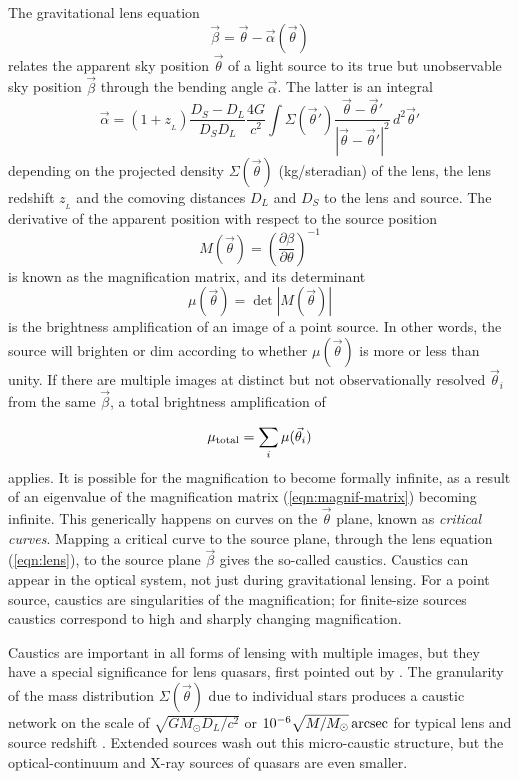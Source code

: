 \documentclass[usenatbib]{mn2e}
\begin{document}
The gravitational lens equation
\begin{equation}
\vec\beta = \vec\theta - \vec\alpha(\vec\theta)
\label{eqn:lens}
\end{equation}
relates the apparent sky position $\vec\theta$ of a light source to
its true but unobservable sky position $\vec\beta$ through the bending
angle $\vec\alpha$.  The latter is an integral 
\begin{equation}
\vec\alpha = (1+z_{_L})\frac{D_S-D_L}{D_SD_L} \frac{4G}{c^2}
\int \Sigma(\vec\theta')
\frac{\vec\theta-\vec\theta'}{|\vec\theta-\vec\theta'|^2}\,
d^2\vec\theta'
\label{eqn:alpha}
\end{equation}
depending on the projected density $\Sigma(\vec\theta)$ (kg/steradian)
of the lens, the lens redshift $z_{_L}$ and the comoving distances
$D_L$ and $D_S$ to the lens and source.  The derivative of the
apparent position with respect to the source position
\begin{equation}
M(\vec\theta) =
\left(\frac{\partial\beta}{\partial\theta}\right)^{-1}
\label{eqn:magnif-matrix}
\end{equation}
is known as the magnification matrix, and its determinant
\begin{equation}
\mu(\vec\theta) = \det|M(\vec\theta)|
\end{equation}
is the brightness amplification of an image of a point source.  In
other words, the source will brighten or dim according to whether
$\mu(\vec\theta)$ is more or less than unity.  If there are multiple
images at distinct but not observationally resolved $\vec\theta_i$ from
the same $\vec\beta$, a total brightness amplification
of

\begin{equation} \mu_{\rm total} = \sum_{i} \mu(\vec\theta_i)
\end{equation}
applies. It is possible for the magnification to become formally
infinite, as a result of an eigenvalue of the magnification matrix
(\ref{eqn:magnif-matrix}) becoming infinite.  This generically happens
on curves on the $\vec\theta$ plane, known as {\em critical curves}.
Mapping a critical curve to the source plane, through the lens
equation (\ref{eqn:lens}), to the source plane $\vec\beta$ gives the
so-called caustics.  Caustics can appear in the optical system, not just
during gravitational lensing.  For a point source, caustics are singularities
of the magnification; for finite-size sources caustics correspond to
high and sharply changing magnification.

Caustics are important in all forms of lensing with multiple images,
but they have a special significance for lens quasars, first pointed
out by \cite{1979Natur.282..561C}.  The granularity of the mass
distribution $\Sigma(\vec\theta)$ due to individual stars produces a
caustic network on the scale of $\sqrt{GM_\odot D_L/c^2}$ or $10^{-6}
\sqrt{M/M_\odot}\rm\,arcsec$ for typical lens and source redshift
\citep{2001PASA...18..207W}.  Extended sources wash out this
micro-caustic structure, but the optical-continuum and X-ray sources
of quasars are even smaller.
\end{document}
